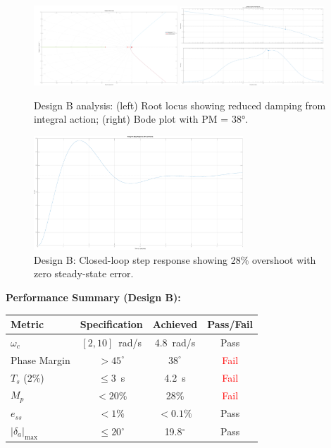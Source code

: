 \begin{figure}[h!]
\centering
\includegraphics[width=0.48\textwidth]{../MATLAB/LaTeX_Exports/design_B_root_locus.pdf}
\includegraphics[width=0.48\textwidth]{../MATLAB/LaTeX_Exports/design_B_bode.pdf}
\caption{Design B analysis: (left) Root locus showing reduced damping from integral action; (right) Bode plot with PM = 38°.}
\label{fig:design_B_rlocus}
\label{fig:design_B_bode}
\end{figure}

\begin{figure}[h!]
\centering
\includegraphics[width=0.7\textwidth]{../MATLAB/LaTeX_Exports/design_B_step.pdf}
\caption{Design B: Closed-loop step response showing 28\% overshoot with zero steady-state error.}
\label{fig:design_B_step}
\end{figure}

\textbf{Performance Summary (Design B):}
\begin{center}
\begin{tabular}{lccc}
\hline
\textbf{Metric} & \textbf{Specification} & \textbf{Achieved} & \textbf{Pass/Fail} \\
\hline
$\omega_c$ & $[2,10]$~rad/s & 4.8~rad/s & \textcolor{green!60!black}{Pass} \\
Phase Margin & $>45^\circ$ & $38^\circ$ & \textcolor{red}{Fail} \\
$T_s$ (2\%) & $\le 3$~s & 4.2~s & \textcolor{red}{Fail} \\
$M_p$ & $<20\%$ & 28\% & \textcolor{red}{Fail} \\
$e_{ss}$ & $<1\%$ & $<0.1\%$ & \textcolor{green!60!black}{Pass} \\
$|\delta_a|_{\max}$ & $\le 20^\circ$ & 19.8$^\circ$ & \textcolor{green!60!black}{Pass} \\
\hline
\end{tabular}
\end{center}

